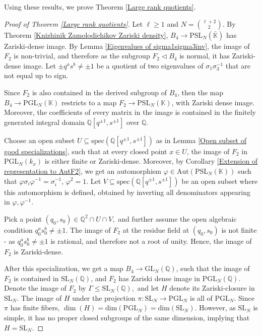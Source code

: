 \documentclass[letterpaper]{amsart}
\begin{document}
Using these results, we prove Theorem \ref{Large rank quotients}.
\begin{proof}[Proof of Theorem \ref{Large rank quotients}]
Let $\ell \geq 1$ and $N = \binom{\ell + 2}{2}$. By Theorem \ref{Knizhinik Zamolodichikov Zariski density}, $B_4 \to \mathrm{PSL}_N(\bar{\mathbb{K}})$ has Zariski-dense image. By Lemma \ref{Eigenvalues of sigma1sigma3inv}, the image of $F_2$ is non-trivial, and therefore as the subgroup $F_2 \lhd B_4$ is normal, it has Zariski-dense image. Let $\pm q^as^b \neq \pm 1$ be a quotient of two eigenvalues of $\sigma_1\sigma_3^{-1}$ that are not equal up to sign.

Since $F_2$ is also contained in the derived subgroup of $B_4$, then the map $B_4 \to \mathrm{PGL}_N(\mathbb{K})$ restricts to a map $F_2 \to \mathrm{PSL}_N(\mathbb{K})$, with Zariski dense image. Moreover, the coefficients of every matrix in the image is contained in the finitely generated integral domain $\mathbb{Q}[q^{\pm 1}, s^{\pm 1}]$ over $\mathbb{Q}$.

Choose an open subset $U \subseteq \mathrm{spec}(\mathbb{Q}[q^{\pm 1}, s^{\pm 1}])$ as in Lemma \ref{Open subset of good specializations}, such that at every closed point $x \in U$, the image of $F_2$ in $\mathrm{PGL}_N(k_x)$ is either finite or Zariski-dense. Moreover, by Corollary \ref{Extension of representation to AutF2}, we get an automorphism $\varphi \in \mathrm{Aut}(\mathrm{PSL}_N(\mathbb{K}))$ such that $\varphi\sigma_i\varphi^{-1} = \sigma_i^{-1}$, $\varphi^2 = 1$. Let $V \subseteq \mathrm{spec}(\mathbb{Q}[q^{\pm 1}, s^{\pm 1}])$ be an open subset where this automorphism is defined, obtained by inverting all denominators appearing in $\varphi, \varphi^{-1}$.

Pick a point $(q_0, s_0) \in \mathbb{Q}^2 \cap U \cap V,$ and further assume the open algebraic condition $q_0^as_0^b \neq \pm 1$. The image of $F_2$ at the residue field at $(q_0, s_0)$ is not finite - as $q_0^as_0^b \neq \pm 1$ is rational, and therefore not a root of unity. Hence, the image of $F_2$ is Zariski-dense.

After this specialization, we get a map $B_4 \to \mathrm{GL}_N(\mathbb{Q})$, such that the image of $F_2$ is contained in $\mathrm{SL}_N(\mathbb{Q})$, and $F_2$ has Zariski dense image in $\mathrm{PGL}_N(\mathbb{Q})$. Denote the image of $F_2$ by $\Gamma \leq \mathrm{SL}_N(\mathbb{Q}),$ and let $H$ denote its Zariski-closure in $\mathrm{SL}_N.$ The image of $H$ under the projection $\pi:\mathrm{SL}_N \to \mathrm{PGL}_N$ is all of $\mathrm{PGL}_N$. Since $\pi$ has finite fibers, $\dim(H)=\mathrm{dim}(\mathrm{PGL}_N)=\mathrm{dim}(\mathrm{SL}_N)$. However, as $\mathrm{SL}_N$ is simple, it has no proper closed subgroups of the same dimension, implying that $H = \mathrm{SL}_N$.


\end{proof}
\end{document}
